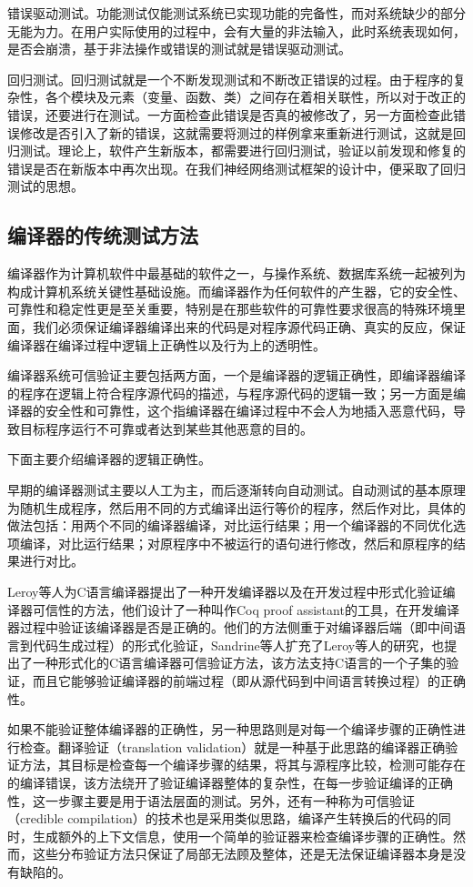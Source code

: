 错误驱动测试。功能测试仅能测试系统已实现功能的完备性，而对系统缺少的部分无能为力。在用户实际使用的过程中，会有大量的非法输入，此时系统表现如何，是否会崩溃，基于非法操作或错误的测试就是错误驱动测试。

回归测试。回归测试就是一个不断发现测试和不断改正错误的过程。由于程序的复杂性，各个模块及元素（变量、函数、类）之间存在着相关联性，所以对于改正的错误，还要进行在测试。一方面检查此错误是否真的被修改了，另一方面检查此错误修改是否引入了新的错误，这就需要将测过的样例拿来重新进行测试，这就是回归测试。理论上，软件产生新版本，都需要进行回归测试，验证以前发现和修复的错误是否在新版本中再次出现。在我们神经网络测试框架的设计中，便采取了回归测试的思想。

\subsection{编译器的传统测试方法}
编译器作为计算机软件中最基础的软件之一，与操作系统、数据库系统一起被列为构成计算机系统关键性基础设施。而编译器作为任何软件的产生器，它的安全性、可靠性和稳定性更是至关重要，特别是在那些软件的可靠性要求很高的特殊环境里面，我们必须保证编译器编译出来的代码是对程序源代码正确、真实的反应，保证编译器在编译过程中逻辑上正确性以及行为上的透明性。

编译器系统可信验证主要包括两方面，一个是编译器的逻辑正确性，即编译器编译的程序在逻辑上符合程序源代码的描述，与程序源代码的逻辑一致；另一方面是编译器的安全性和可靠性，这个指编译器在编译过程中不会人为地插入恶意代码，导致目标程序运行不可靠或者达到某些其他恶意的目的。

下面主要介绍编译器的逻辑正确性。

早期的编译器测试主要以人工为主，而后逐渐转向自动测试。自动测试的基本原理为随机生成程序，然后用不同的方式编译出运行等价的程序，然后作对比，具体的做法包括：用两个不同的编译器编译，对比运行结果；用一个编译器的不同优化选项编译，对比运行结果；对原程序中不被运行的语句进行修改，然后和原程序的结果进行对比。

Leroy等人为C语言编译器提出了一种开发编译器以及在开发过程中形式化验证编译器可信性的方法，他们设计了一种叫作Coq proof assistant的工具，在开发编译器过程中验证该编译器是否是正确的。他们的方法侧重于对编译器后端（即中间语言到代码生成过程）的形式化验证，Sandrine等人扩充了Leroy等人的研究，也提出了一种形式化的C语言编译器可信验证方法，该方法支持C语言的一个子集的验证，而且它能够验证编译器的前端过程（即从源代码到中间语言转换过程）的正确性。

如果不能验证整体编译器的正确性，另一种思路则是对每一个编译步骤的正确性进行检查。翻译验证（translation validation）就是一种基于此思路的编译器正确验证方法，其目标是检查每一个编译步骤的结果，将其与源程序比较，检测可能存在的编译错误，该方法绕开了验证编译器整体的复杂性，在每一步验证编译的正确性，这一步骤主要是用于语法层面的测试。另外，还有一种称为可信验证（credible compilation）的技术也是采用类似思路，编译产生转换后的代码的同时，生成额外的上下文信息，使用一个简单的验证器来检查编译步骤的正确性。然而，这些分布验证方法只保证了局部无法顾及整体，还是无法保证编译器本身是没有缺陷的。

